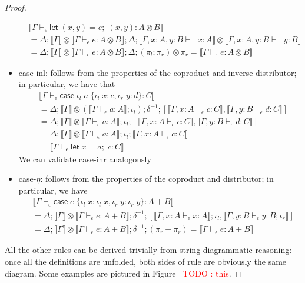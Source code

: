 \documentclass[acmsmall,screen,review]{acmart}
\newcounter{todos}
\newcommand{\todo}[1]{\stepcounter{todos} \textcolor{red}{TODO \arabic{todos}: #1}}
\newcommand{\ms}[1]{\ensuremath{\mathsf{#1}}}
\newcommand{\lto}{:}
\newcommand{\linl}[1]{\iota_l\;{#1}}
\newcommand{\linr}[1]{\iota_r\;{#1}}
\newcommand{\letexpr}[3]{\ensuremath{\ms{let}\;#1 = #2;\;#3}}
\newcommand{\caseexpr}[5]{\ms{case}\;#1\;\{\linl{#2} \lto #3, \linr{#4} \lto #5\}}
\newcommand{\bhyp}[2]{#1 : #2}
\newcommand{\hasty}[4]{#1 \vdash_{#2} #3: {#4}}
\newcommand{\brle}[1]{{\scriptsize\textsf{#1}}}
\newcommand{\dnt}[1]{\llbracket{#1}\rrbracket}
\begin{document}
\begin{proof}
\begin{itemize}
\begin{align*}
      &\dnt{\hasty{\Gamma}{\epsilon}{\letexpr{(x, y)}{e}{(x, y)}}{A \otimes B}} \\
      &= \Delta ; \dnt{\Gamma} \otimes \dnt{\hasty{\Gamma}{\epsilon}{e}{A \otimes B}}
                ; \Delta ; 
                \dnt{\hasty{\Gamma, \bhyp{x}{A}, \bhyp{y}{B}}{\bot}{x}{A}} \otimes
                \dnt{\hasty{\Gamma, \bhyp{x}{A}, \bhyp{y}{B}}{\bot}{y}{B}} \\
      &= \Delta ; \dnt{\Gamma} \otimes \dnt{\hasty{\Gamma}{\epsilon}{e}{A \otimes B}}
                ; \Delta ; (\pi_l ; \pi_r) \otimes \pi_r
       = \dnt{\hasty{\Gamma}{\epsilon}{e}{A \otimes B}}
    \end{align*}
    \item \brle{case-inl}: follows from the properties of the coproduct and inverse distributor; in
    particular, we have that
    \begin{align*}
      & \dnt{\hasty{\Gamma}{\epsilon}{\caseexpr{\linl{a}}{x}{c}{y}{d}}{C}}
      \\ &= \Delta 
      ; \dnt{\Gamma} \otimes (\dnt{\hasty{\Gamma}{\epsilon}{a}{A}} ; \iota_l)
      ; \delta^{-1} ; [
        \dnt{\hasty{\Gamma, \bhyp{x}{A}}{\epsilon}{c}{C}}, 
        \dnt{\hasty{\Gamma, \bhyp{y}{B}}{\epsilon}{d}{C}}
      ]
      \\ &= \Delta 
      ; \dnt{\Gamma} \otimes \dnt{\hasty{\Gamma}{\epsilon}{a}{A}}
      ; \iota_l ; [
        \dnt{\hasty{\Gamma, \bhyp{x}{A}}{\epsilon}{c}{C}}, 
        \dnt{\hasty{\Gamma, \bhyp{y}{B}}{\epsilon}{d}{C}}
      ]
      \\ &= \Delta 
      ; \dnt{\Gamma} \otimes \dnt{\hasty{\Gamma}{\epsilon}{a}{A}}
      ; \iota_l ; \dnt{\hasty{\Gamma, \bhyp{x}{A}}{\epsilon}{c}{C}}
      \\ &= \dnt{\hasty{\Gamma}{\epsilon}{\letexpr{x}{a}{c}}{C}}
    \end{align*}
    We can validate \brle{case-inr} analogously
    \item \brle{case-$\eta$}: follows from the properties of the coproduct and distributor; in
    particular, we have
    \begin{align*}
      & \dnt{\hasty{\Gamma}{\epsilon}{\caseexpr{e}{x}{\linl{x}}{y}{\linr{y}}}{A + B}} \\
      &= \Delta ; \dnt{\Gamma} \otimes \dnt{\hasty{\Gamma}{\epsilon}{e}{A + B}} ; \delta^{-1} ; [
        \dnt{\hasty{\Gamma, \bhyp{x}{A}}{\epsilon}{x}{A}};\iota_l,
        \dnt{\hasty{\Gamma, \bhyp{y}{B}}{\epsilon}{y}{B};\iota_r}
      ] \\
      &= \Delta ; \dnt{\Gamma} \otimes \dnt{\hasty{\Gamma}{\epsilon}{e}{A + B}} 
                ; \delta^{-1} ; (\pi_r + \pi_r)
      = \dnt{\hasty{\Gamma}{\epsilon}{e}{A + B}} 
    \end{align*}
  \end{itemize}
  All the other rules can be derived trivially from string diagrammatic reasoning: once all the
  definitions are unfolded, both sides of rule are obviously the same diagram. Some examples are
  pictured in Figure~\todo{this}.
\end{proof}
\end{document}
